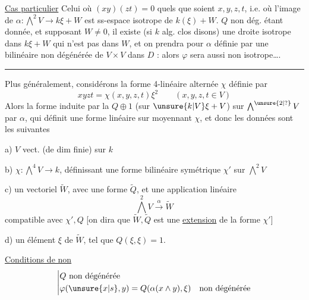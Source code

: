 \uline{Cas particulier} Celui où $(xy)(zt)=0$ \inserted{[i.e. $(H^1)\deleted{\unsure{H|\otimes}}^{3}=0$ dans $H^4$ !]} quels que soient $x,y,z,t$, i.e. où l'image de $\alpha:\bigwedge^2 V\to k\xi+W$ est   ss-espace isotrope de $k(\xi)+W$.  $Q$ non dég. étant donnée, et supposant $W\ne0$, il existe (si $k$ alg. clos disons) une droite isotrope  dans $k\xi+W$ qui n'est pas dans $W$, et on prendra pour $\alpha$  définie par une  bilinéaire  non dégénérée  de $V\times V$ dans $D$ : alors $\varphi$ sera aussi non isotrope\ldots.

\begin{center}\rule{3em}{.4pt}\end{center}

Plus généralement, considérons la forme 4-linéaire alternée $\chi$ définie par
\[
xyzt=\chi(x,y,z,t)\xi^2\qquad (x,y,z,t\in V)
\]
Alors la forme  induite par la  $Q\oplus1$ (sur $\unsure{k|V}\xi+V$) sur $\bigwedge^{\unsure{2|?}}V$ par $\alpha$, qui définit une  forme linéaire sur
moyennant $\chi$, et donc les données sont les suivantes

a) $V$ vect. (de dim finie) sur $k$


b) $\chi:\bigwedge^4 V\to k$, définissant une forme bilinéaire symétrique $\chi'$ sur $\bigwedge^2 V$

c) un vectoriel $\widetilde W$, avec une forme  $\widetilde Q$, et une application linéaire
\[
\bigwedge^2 V\xrightarrow{\alpha}\widetilde W
\]
compatible avec $\chi',Q$ [on dira que $\widetilde W,\widetilde Q$ est une \uline{extension} de la forme $\chi'$]

d) un élément $\xi$ de $\widetilde W$, tel que $Q(\xi,\xi)=1$.

\uline{Conditions de non }
\[
\left|\begin{aligned}
&Q\ \text{non dégénérée}\\
&\varphi(\unsure{x|s},y)=Q(\alpha(x\wedge y),\xi)\quad\text{non dégénérée}
\end{aligned}\right.
\]
